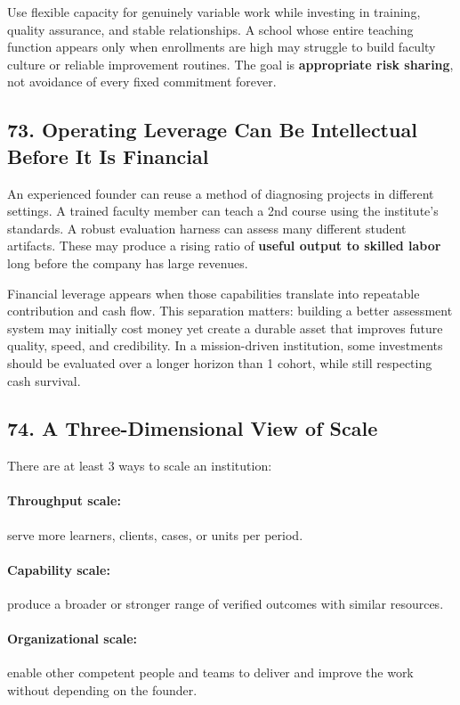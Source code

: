 Use flexible capacity for genuinely variable work while investing in training, quality assurance, and stable relationships. A school whose entire teaching function appears only when enrollments are high may struggle to build faculty culture or reliable improvement routines. The goal is \textbf{appropriate risk sharing}, not avoidance of every fixed commitment forever.

\subsection*{73. Operating Leverage Can Be Intellectual Before It Is Financial}

An experienced founder can reuse a method of diagnosing projects in different settings. A trained faculty member can teach a 2nd course using the institute's standards. A robust evaluation harness can assess many different student artifacts. These may produce a rising ratio of \textbf{useful output to skilled labor} long before the company has large revenues.

Financial leverage appears when those capabilities translate into repeatable contribution and cash flow. This separation matters: building a better assessment system may initially cost money yet create a durable asset that improves future quality, speed, and credibility. In a mission-driven institution, some investments should be evaluated over a longer horizon than 1 cohort, while still respecting cash survival.

\subsection*{74. A Three-Dimensional View of Scale}

There are at least 3 ways to scale an institution:

\paragraph*{Throughput scale:} serve more learners, clients, cases, or units per period.

\paragraph*{Capability scale:} produce a broader or stronger range of verified outcomes with similar resources.

\paragraph*{Organizational scale:} enable other competent people and teams to deliver and improve the work without depending on the founder.

